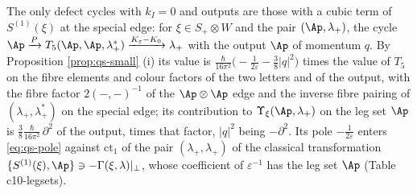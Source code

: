 \begin{example}
\label{ex:qs-cubic}
The only defect cycles with $k_I=0$ and outputs are those with a cubic term of $S^{(1)}(\xi)$ at the special edge: for $\xi\in S_+\otimes W$ and the pair $(\Ap,\lambda_+)$, the cycle $\Ap\xrightarrow{P}T_5(\Ap,\Ap,\lambda^*_+)\xrightarrow{K_\varepsilon-K_0}\lambda_+$ with the output $\Ap$ of momentum $q$. By Proposition \ref{prop:qs-small} (i) its value is $\frac{\hbar}{16\pi^2}\big(-\frac1{2\varepsilon}-\frac38|q|^2\big)$ times the value of $T_5$ on the fibre elements and colour factors of the two letters and of the output, with the fibre factor $2(-,-)^{-1}$ of the $\Ap\otimes\Ap$ edge and the inverse fibre pairing of $(\lambda_+,\lambda^*_+)$ on the special edge; its contribution to $\Upsilon_\xi(\Ap,\lambda_+)$ on the leg set $\Ap$ is $\frac38\frac{\hbar}{16\pi^2}\,\partial^2$ of the output, times that factor, $|q|^2$ being $-\partial^2$. Its pole $-\frac1{2\varepsilon}$ enters \eqref{eq:qs-pole} against $\mathrm{ct}_1$ of the pair $(\lambda_+,\lambda_+)$ of the classical transformation $\{S^{(1)}(\xi),\Ap\}\ni-\Gamma(\xi,\lambda)|_\perp$, whose coefficient of $\varepsilon^{-1}$ has the leg set $\Ap$ (Table c10-legsets).
\end{example}

